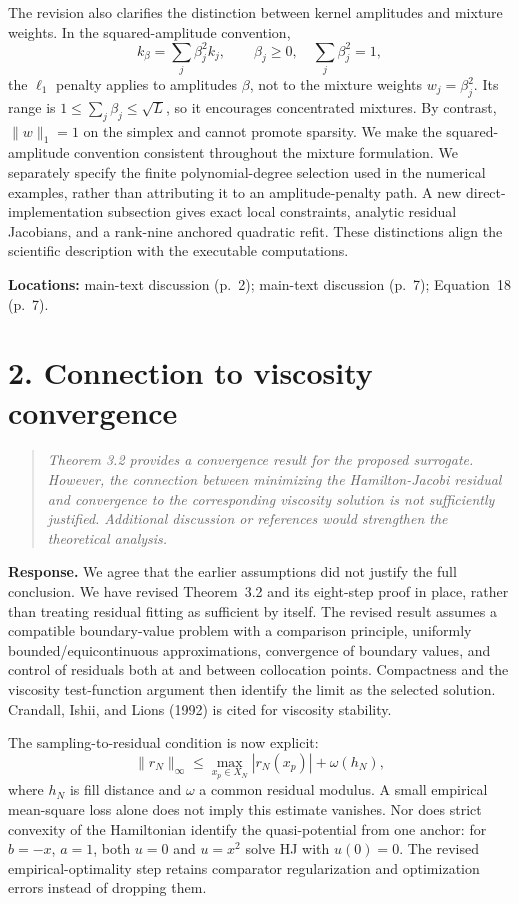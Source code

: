\documentclass[11pt]{article}
\newcommand{\comment}[1]{\begin{quote}\small\itshape #1\end{quote}}
\begin{document}
The revision also clarifies the distinction between kernel amplitudes and mixture weights. In the squared-amplitude convention,
\[
 k_\beta=\sum_j\beta_j^2k_j,\qquad \beta_j\geq0,\quad \sum_j\beta_j^2=1,
\]
the $\ell_1$ penalty applies to amplitudes $\beta$, not to the mixture weights $w_j=\beta_j^2$. Its range is $1\leq\sum_j\beta_j\leq\sqrt L$, so it encourages concentrated mixtures. By contrast, $\|w\|_1=1$ on the simplex and cannot promote sparsity. We make the squared-amplitude convention consistent throughout the mixture formulation. We separately specify the finite polynomial-degree selection used in the numerical examples, rather than attributing it to an amplitude-penalty path. A new direct-implementation subsection gives exact local constraints, analytic residual Jacobians, and a rank-nine anchored quadratic refit. These distinctions align the scientific description with the executable computations.

\textbf{Locations:} main-text discussion (p.~2); main-text discussion (p.~7); Equation~18 (p.~7).

\section*{2. Connection to viscosity convergence}
\comment{Theorem 3.2 provides a convergence result for the proposed surrogate. However, the connection between minimizing the Hamilton-Jacobi residual and convergence to the corresponding viscosity solution is not sufficiently justified. Additional discussion or references would strengthen the theoretical analysis.}

\textbf{Response.} We agree that the earlier assumptions did not justify the full conclusion. We have revised Theorem~3.2 and its eight-step proof in place, rather than treating residual fitting as sufficient by itself. The revised result assumes a compatible boundary-value problem with a comparison principle, uniformly bounded/equicontinuous approximations, convergence of boundary values, and control of residuals both at and between collocation points. Compactness and the viscosity test-function argument then identify the limit as the selected solution. Crandall, Ishii, and Lions (1992) is cited for viscosity stability.

The sampling-to-residual condition is now explicit:
\[
 \|r_N\|_\infty\leq\max_{x_p\in X_N}|r_N(x_p)|+\omega(h_N),
\]
where $h_N$ is fill distance and $\omega$ a common residual modulus. A small empirical mean-square loss alone does not imply this estimate vanishes. Nor does strict convexity of the Hamiltonian identify the quasi-potential from one anchor: for $b=-x$, $a=1$, both $u=0$ and $u=x^2$ solve HJ with $u(0)=0$. The revised empirical-optimality step retains comparator regularization and optimization errors instead of dropping them.
\end{document}
